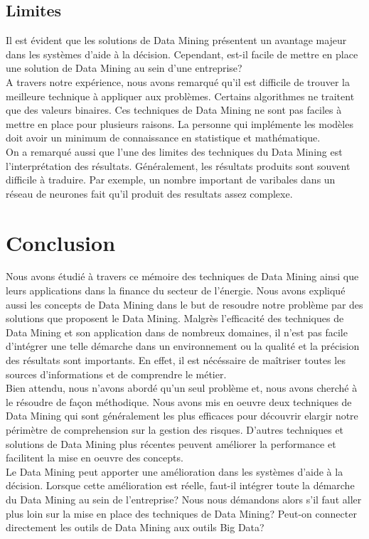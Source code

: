 \documentclass[11pt,a4paper]{report}
\begin{document}
\subsection{Limites}
Il est évident que les solutions de Data Mining présentent un avantage majeur dans les systèmes d'aide à la décision. Cependant, est-il facile de mettre en place une solution de Data Mining au sein d'une entreprise? \\

A travers notre expérience, nous avons remarqué qu'il est difficile de trouver la meilleure technique à appliquer aux problèmes. Certains algorithmes ne traitent que des valeurs binaires. Ces techniques de Data Mining ne sont pas faciles à mettre en place pour plusieurs raisons. La personne qui implémente les modèles doit avoir un minimum de connaissance en statistique et mathématique.\\

On a remarqué aussi que l'une des limites des techniques du Data Mining est l'interprétation des résultats. Généralement, les résultats produits sont souvent difficile à traduire. Par exemple, un nombre important de varibales dans un réseau de neurones fait qu'il produit des resultats assez complexe. 
\newpage
\section{Conclusion}
Nous avons étudié à travers ce mémoire des techniques de Data Mining ainsi que leurs applications dans la finance du secteur de l'énergie. Nous avons expliqué aussi les concepts de Data Mining dans le but de resoudre notre problème par des solutions que proposent le Data Mining. Malgrès l'efficacité des techniques de Data Mining et son application dans de nombreux domaines, il n'est pas facile d'intégrer une telle démarche dans un environnement ou la qualité et la précision des résultats sont importants. En effet, il est nécéssaire de maîtriser toutes les sources d'informations et de comprendre le métier.\\

Bien attendu, nous n'avons abordé qu'un seul problème et, nous avons cherché à le résoudre de façon méthodique. Nous avons mis en oeuvre deux techniques de Data Mining qui sont généralement les plus efficaces pour découvrir elargir notre périmètre de comprehension sur la gestion des risques. D'autres techniques et solutions de Data Mining  plus récentes peuvent améliorer la performance et facilitent la mise en oeuvre des concepts. \\

Le Data Mining peut apporter une amélioration dans les systèmes d'aide à la décision. Lorsque cette amélioration est réelle, faut-il intégrer toute la démarche du Data Mining au sein de l'entreprise? Nous nous démandons alors s'il faut aller plus loin sur la mise en place des techniques de Data Mining? Peut-on connecter directement les outils de Data Mining aux outils Big Data?
 \newpage
 

\end{document}
